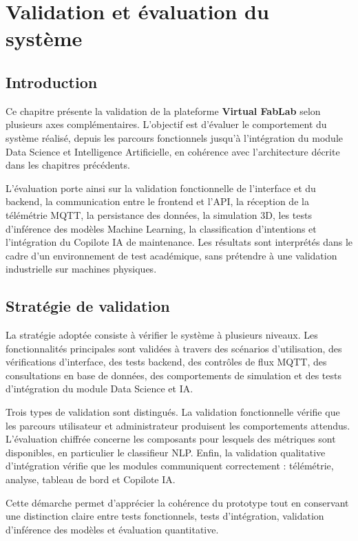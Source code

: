 \chapter{Validation et évaluation du système}

\section{Introduction}

Ce chapitre présente la validation de la plateforme \textbf{Virtual FabLab} selon plusieurs axes complémentaires. L'objectif est d'évaluer le comportement du système réalisé, depuis les parcours fonctionnels jusqu'à l'intégration du module Data Science et Intelligence Artificielle, en cohérence avec l'architecture décrite dans les chapitres précédents.

L'évaluation porte ainsi sur la validation fonctionnelle de l'interface et du backend, la communication entre le frontend et l'API, la réception de la télémétrie MQTT, la persistance des données, la simulation 3D, les tests d'inférence des modèles Machine Learning, la classification d'intentions et l'intégration du Copilote IA de maintenance. Les résultats sont interprétés dans le cadre d'un environnement de test académique, sans prétendre à une validation industrielle sur machines physiques.

\section{Stratégie de validation}

La stratégie adoptée consiste à vérifier le système à plusieurs niveaux. Les fonctionnalités principales sont validées à travers des scénarios d'utilisation, des vérifications d'interface, des tests backend, des contrôles de flux MQTT, des consultations en base de données, des comportements de simulation et des tests d'intégration du module Data Science et IA.

Trois types de validation sont distingués. La validation fonctionnelle vérifie que les parcours utilisateur et administrateur produisent les comportements attendus. L'évaluation chiffrée concerne les composants pour lesquels des métriques sont disponibles, en particulier le classifieur NLP. Enfin, la validation qualitative d'intégration vérifie que les modules communiquent correctement : télémétrie, analyse, tableau de bord et Copilote IA.

Cette démarche permet d'apprécier la cohérence du prototype tout en conservant une distinction claire entre tests fonctionnels, tests d'intégration, validation d'inférence des modèles et évaluation quantitative.

